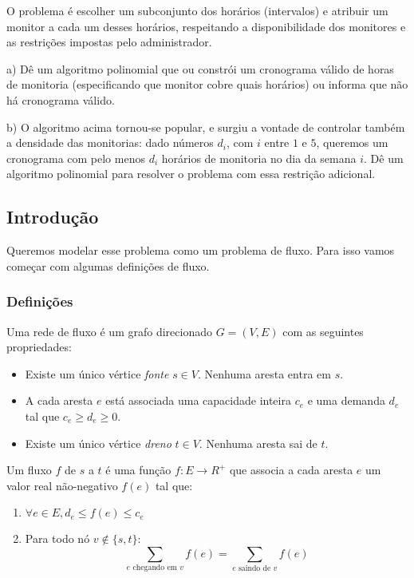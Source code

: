 \documentclass[11pt]{article}
\begin{document}
O problema é escolher um subconjunto dos horários (intervalos) e
atribuir um monitor a cada um desses horários, respeitando a
disponibilidade dos monitores e as restrições impostas pelo
administrador.


a) Dê um algoritmo polinomial que ou constrói um cronograma
   válido de horas de monitoria (especificando que monitor cobre
   quais horários) ou informa que não há cronograma válido.


b) O algoritmo acima tornou-se popular, e surgiu a vontade de
   controlar também a densidade das monitorias: dado números $d_i$,
   com $i$ entre $1$ e $5$, queremos um cronograma com pelo menos
   $d_i$ horários de monitoria no dia da semana $i$. Dê um
   algoritmo polinomial para resolver o problema com essa restrição
   adicional.


\subsection{Introdução}
\label{sec-2-2}

Queremos modelar esse problema como um problema de fluxo. Para isso
vamos começar com algumas definições de fluxo.

\subsubsection{Definições}
\label{sec-2-2-1}

Uma rede de fluxo é um grafo direcionado $G =
(V, E)$ com as seguintes propriedades:
\begin{itemize}
\item Existe um único vértice \textit{fonte} $s \in V$. Nenhuma aresta entra em $s$.
\item A cada aresta $e$ está associada uma capacidade inteira $c_e$ e
uma demanda $d_e$ tal que $c_e \geq d_e \geq 0$.
\item Existe um único vértice \textit{dreno} $t \in V$. Nenhuma aresta sai de $t$.
\end{itemize}

Um fluxo $f$ de $s$ a $t$ é uma função $f \colon E \to R^+$ que associa a cada
aresta $e$ um valor real não-negativo $f(e)$ tal que:

\begin{enumerate}
\item $\forall e \in E, d_e \leq f(e) \leq c_e$
\item Para todo nó $v \not\in \{s,t\}$:
\[ \sum_{e \text{ chegando em } v} f(e) = \sum_{e \text{ saindo de } v} f(e) \]
\end{enumerate}
\end{document}
